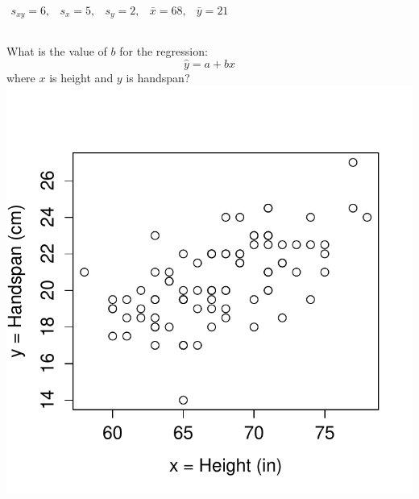 \documentclass[handout]{beamer}
\begin{document}
\begin{frame}
$\begin{array}{ccccc} s_{xy} = 6,&s_x = 5,& s_y = 2,& \bar{x} = 68,& \bar{y} = 21\end{array}$
\begin{columns}[c]
\column{2.5in}
What is the value of $b$ for the regression: $$\hat{y}=a+bx$$
where $x$ is height and $y$ is handspan?
\column{1.8in}
\includegraphics[scale = 0.4]{./images/height_handspan1}
\end{columns}
\alert{$$\phantom{b = \frac{s_{xy}}{s_x^2} = \frac{6}{(4.5)^2} = 6/20.25 \approx 0.3}$$}
\end{frame}
\end{document}
